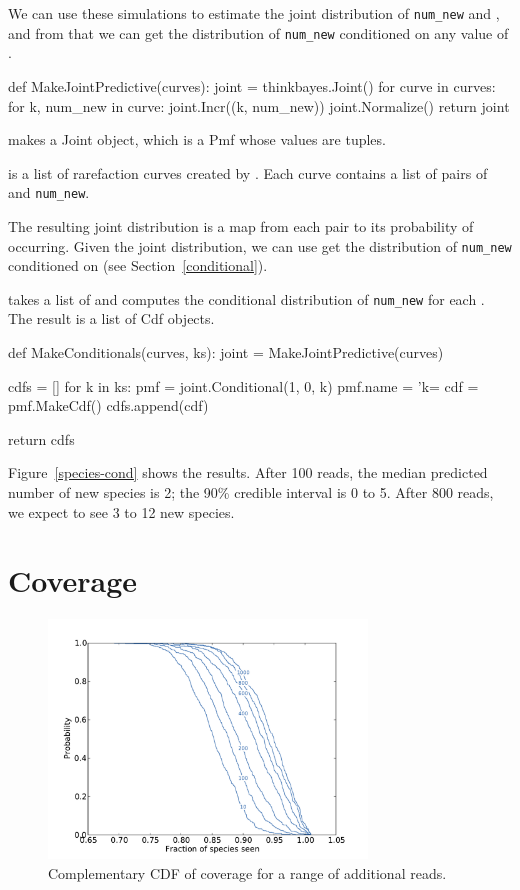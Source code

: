 \documentclass[12pt]{book}
\theoremstyle{exercise}
\begin{document}
We can use these simulations to estimate the
joint distribution of \verb"num_new" and , and from that
we can get the distribution of \verb"num_new" conditioned on any
value of .

\begin{code}
def MakeJointPredictive(curves):
    joint = thinkbayes.Joint()
    for curve in curves:
        for k, num_new in curve:
            joint.Incr((k, num_new))
    joint.Normalize()
    return joint
\end{code}

 makes a Joint object, which is a
Pmf whose values are tuples.

 is a list of rarefaction curves created by
.  Each curve contains a list of pairs of
 and \verb"num_new".

The resulting joint distribution is a map from each pair to
its probability of occurring.  Given the joint distribution, we
can use 
get the distribution of \verb"num_new" conditioned on 
(see Section~\ref{conditional}).

 takes a list of 
and computes the conditional distribution of \verb"num_new"
for each .  The result is a list of Cdf objects.

\begin{code}
def MakeConditionals(curves, ks):
    joint = MakeJointPredictive(curves)

    cdfs = []
    for k in ks:
        pmf = joint.Conditional(1, 0, k)
        pmf.name = 'k=%
        cdf = pmf.MakeCdf()
        cdfs.append(cdf)

    return cdfs
\end{code}

Figure~\ref{species-cond} shows the results.  After 100 reads, the
median predicted number of new species is 2; the 90\% credible
interval is 0 to 5.  After 800 reads, we expect to see 3 to 12 new
species.


\section{Coverage}

\begin{figure}
\centerline{\includegraphics[height=2.5in]{figs/species-frac-B1242.pdf}}
\caption{Complementary CDF of coverage for a range of additional reads.}
\label{species-frac}
\end{figure}
\end{document}
